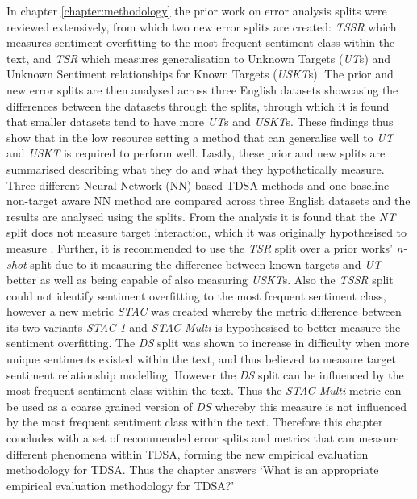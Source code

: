 In chapter \ref{chapter:methodology} the prior work on error analysis splits were reviewed extensively, from which two new error splits are created: \textit{TSSR} which measures sentiment overfitting to the most frequent sentiment class within the text, and \textit{TSR} which measures generalisation to Unknown Targets (\textit{UT}s) and Unknown Sentiment relationships for Known Targets (\textit{USKT}s). The prior and new error splits are then analysed across three English datasets showcasing the differences between the datasets through the splits, through which it is found that smaller datasets tend to have more \textit{UT}s and \textit{USKT}s. These findings thus show that in the low resource setting a method that can generalise well to \textit{UT} and \textit{USKT} is required to perform well. Lastly, these prior and new splits are summarised describing what they do and what they hypothetically measure. Three different Neural Network (NN) based TDSA methods and one baseline non-target aware NN method are compared across three English datasets and the results are analysed using the splits. From the analysis it is found that the \textit{NT} split does not measure target interaction, which it was originally hypothesised to measure \citep{zhang-etal-2019-aspect}. Further, it is recommended to use the \textit{TSR} split over a prior works' \textit{n-shot} split due to it measuring the difference between known targets and \textit{UT} better as well as being capable of also measuring \textit{USKT}s. Also the \textit{TSSR} split could not identify sentiment overfitting to the most frequent sentiment class, however a new metric \textit{STAC} was created whereby the metric difference between its two variants \textit{STAC 1} and \textit{STAC Multi} is hypothesised to better measure the sentiment overfitting. The \textit{DS} split was shown to increase in difficulty when more unique sentiments existed within the text, and thus believed to measure target sentiment relationship modelling. However the \textit{DS} split can be influenced by the most frequent sentiment class within the text. Thus the \textit{STAC Multi} metric can be used as a coarse grained version of \textit{DS} whereby this measure is not influenced by the most frequent sentiment class within the text. Therefore this chapter concludes with a set of recommended error splits and metrics that can measure different phenomena within TDSA, forming the new empirical evaluation methodology for TDSA. Thus the chapter answers  `What is an appropriate empirical evaluation methodology for TDSA?'

